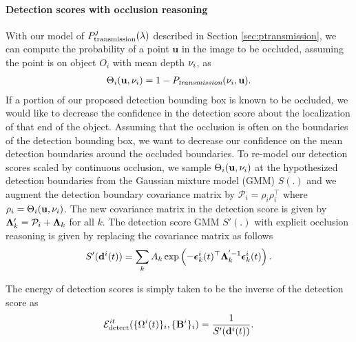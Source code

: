 \paragraph{Detection scores with occlusion reasoning} 
\def\u{\mathbf{u}}
With our model of $P^{j}_{\text{transmission}}(\lambda)$ described in Section \ref{sec:ptransmission}, we can
compute the probability of a point $\u$ in the image to be occluded, assuming
the point is on object $O_i$ with mean depth $\nu_i$, as
\begin{align}
  \Theta_{i}(\u, \meandepth{i}) = 1 - \Ptransmission(\meandepth{i}, \u).
\end{align}
If a portion of our proposed detection bounding box is known to be
occluded, we would like to decrease the confidence in the detection score
about the localization of that end of the object. Assuming that the occlusion
is often on the boundaries of the detection bounding box, we want to decrease our
confidence on the mean detection boundaries around the occluded boundaries.
To re-model our detection scores scaled by continuous occlusion, we sample
$\Theta_{i}(\mathbf{u}, \nu_i)$ at the hypothesized detection boundaries from
the Gaussian mixture model (GMM) $S(.)$ and we augment the detection boundary covariance matrix by
$\mathcal{P}_{i} = \rho_{i}\rho_{i}^\top$ where $\rho_{i} = \Theta_{i}(\mathbf{u},
\nu_i)$. The new covariance matrix in the detection score is given by 
  $\bm{\Lambda}'_k = \mathcal{P}_{i} + \bm{\Lambda}_k$ for all $k$.
The detection score GMM $S'(.)$ with explicit occlusion reasoning is given by replacing the covariance
matrix as follows
%
\begin{multline}
S'(\mathbf{d}^{i}(t)) = \sum_k A_k \exp \left( -{\bm{\epsilon}}_k^{i}(t)^\top \bm{\Lambda}_k^{'-1} {\bm{\epsilon}}_k^{i}(t) \right).
\end{multline}

The energy of detection scores is simply taken to be the inverse of the detection score as
\begin{align}
  \mathcal{E}^{it}_{\text{detect}}(\{ \Omega^{i}(t) \}_i, \{\mathbf{B}^{i}\}_i ) = \frac{1}{S'(\mathbf{d}^{i}(t))}.
\end{align}

